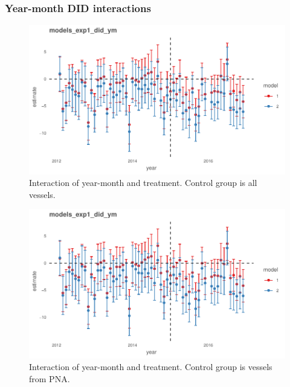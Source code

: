 \documentclass[11pt,english]{article}
\begin{document}
\hypertarget{year-month-did-interactions}{%
\subsubsection{Year-month DID
interactions}\label{year-month-did-interactions}}

\begin{figure}
\centering
\includegraphics{Manuscript_files/figure-latex/unnamed-chunk-24-1.pdf}
\caption{\label{fig:unnamed-chunk-24}\label{fig:ym1}Interaction of
year-month and treatment. Control group is all vessels.}
\end{figure}

\begin{figure}
\centering
\includegraphics{Manuscript_files/figure-latex/unnamed-chunk-25-1.pdf}
\caption{\label{fig:unnamed-chunk-25}\label{fig:ym2}Interaction of
year-month and treatment. Control group is vessels from PNA.}
\end{figure}
\end{document}
